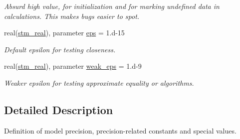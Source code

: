 \begin{CompactItemize}
\begin{CompactList}\small\item\em Absurd high value, for initialization and for marking undefined data in calculations. This makes bugs easier to spot. \item\end{CompactList}\item 
\hypertarget{a00071_75346b905331f4d4b5fe8160e637f70c}{
real(\hyperlink{a00071_be430a25ddbcfe29c5bd13189b85de5d}{stm\_\-real}), parameter \hyperlink{a00071_75346b905331f4d4b5fe8160e637f70c}{eps} = 1.d-15}
\label{a00071_75346b905331f4d4b5fe8160e637f70c}

\begin{CompactList}\small\item\em Default epsilon for testing closeness. \item\end{CompactList}\item 
\hypertarget{a00071_614baa82da5ee6158493502e37d2349c}{
real(\hyperlink{a00071_be430a25ddbcfe29c5bd13189b85de5d}{stm\_\-real}), parameter \hyperlink{a00071_614baa82da5ee6158493502e37d2349c}{weak\_\-eps} = 1.d-9}
\label{a00071_614baa82da5ee6158493502e37d2349c}

\begin{CompactList}\small\item\em Weaker epsilon for testing approximate equality or algorithms. \item\end{CompactList}\end{CompactItemize}


\subsection{Detailed Description}
Definition of model precision, precision-related constants and special values. 


